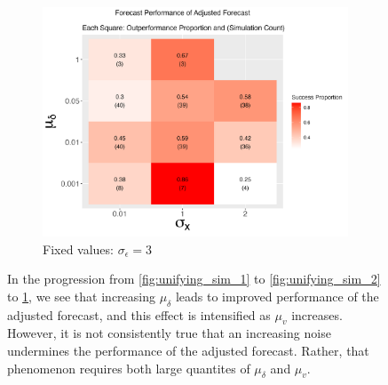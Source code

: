 \documentclass{uiucthesis2021}
\theoremstyle{definition}
\begin{document}
\begin{figure}[!h]
  \begin{subfigure}{.44\linewidth} 
    \centering
      \includegraphics[scale=.42]{simulation_plots/Nov27_160343_2024_mudelta_sigmax.png}
      \caption{Fixed values: $\sigma_{\epsilon}=3$}\label{fig:unifying_sim_3}
  \end{subfigure}
  
      \caption{In the progression from \ref{fig:unifying_sim_1} to \ref{fig:unifying_sim_2} to \ref{fig:unifying_sim_3}, we see that increasing $\mu_{\delta}$ leads to improved performance of the adjusted forecast, and this effect is intensified as $\mu_{v}$ increases.  However, it is not consistently true that an increasing noise undermines the performance of the adjusted forecast.  Rather, that phenomenon requires both large quantites of $\mu_{\delta}$ and $\mu_{v}$.}
      \label{fig:set_of_three_one}
    \end{figure}
  
\end{document}
